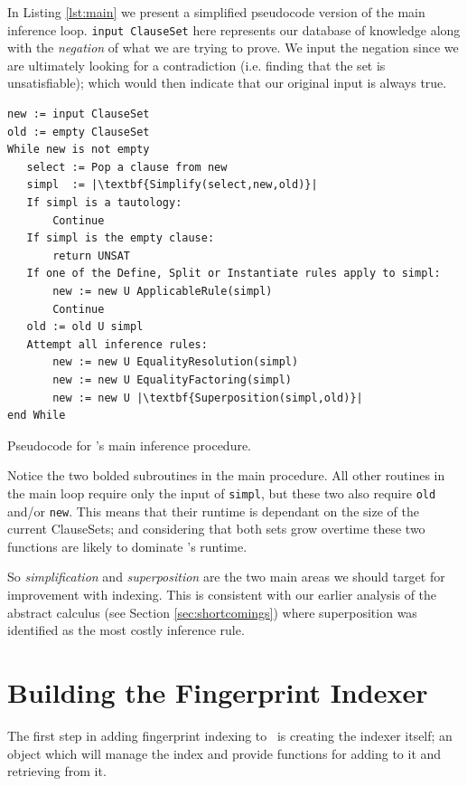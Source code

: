 In Listing \ref{lst:main} we present a simplified pseudocode version of the main inference loop.
\verb!input ClauseSet! here represents our database of knowledge along with
the \emph{negation} of what we are trying to prove. We input the negation since
we are ultimately looking for a contradiction (i.e. finding that the set is unsatisfiable);
which would then indicate that our original input is always true.
\begin{listing}[H]
\begin{lstlisting}
new := input ClauseSet
old := empty ClauseSet
While new is not empty
   select := Pop a clause from new
   simpl  := |\textbf{Simplify(select,new,old)}|
   If simpl is a tautology:
       Continue
   If simpl is the empty clause:
       return UNSAT
   If one of the Define, Split or Instantiate rules apply to simpl:
       new := new U ApplicableRule(simpl)
       Continue
   old := old U simpl
   Attempt all inference rules:
       new := new U EqualityResolution(simpl)
       new := new U EqualityFactoring(simpl)
       new := new U |\textbf{Superposition(simpl,old)}|
end While
\end{lstlisting}
\caption{Pseudocode for \beagle's main inference procedure.}
\label{lst:main}
\end{listing}

Notice the two bolded subroutines in the main procedure. All other
routines in the main loop require only the input of \verb!simpl!, but these two
also require \verb!old! and/or \verb!new!. This means that their runtime is dependant
on the size of the current ClauseSets; and considering that both sets grow overtime
these two functions are likely to dominate \beagle's runtime.

So \emph{simplification} and \emph{superposition} are the two main areas
we should target for improvement with indexing. This is consistent
with our earlier analysis of the abstract calculus (see Section \ref{sec:shortcomings})
where superposition was identified as the most costly inference rule.

\section{Building the Fingerprint Indexer}
\label{sec:initial}

The first step in adding fingerprint indexing to \beagle\ is creating the indexer
itself; an object which will manage the index and provide functions for adding
to it and retrieving from it.


